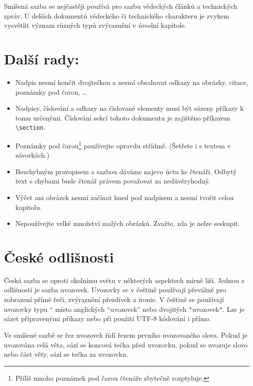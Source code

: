 \documentclass[a4paper,twocolumn,10pt]{article}
\newcommand{\czuv}[1]{\quotedblbase #1\textquotedblleft}
\begin{document}
Smíšená sazba se nejčastěji používá pro sazbu vědeckých článků a technických zpráv.
U delších dokumentů vědeckého či technického charakteru je zvykem vysvětlit význam různých typů zvýraznění v úvodní kapitole.

\section{Další rady:}\label{sec:3}
\begin{itemize}
\item Nadpis nesmí končit dvojtečkou a nesmí obsahovat odkazy na obrázky, citace, poznámky pod čarou, \dots

\item Nadpisy, číslování a odkazy na číslované elementy musí být sázeny příkazy k tomu určenými.
Číslo\-vání sekcí tohoto dokumentu je zajištěno příkazem \verb|\section|.

\item Poznámky pod čarou\footnote{Příliš mnoho poznámek pod čarou čtenáře zbytečně rozptyluje.} používejte opravdu střídmě.
(Šetřete i s textem v závorkách.)

\item Bezchybným pravopisem a sazbou dáváme najevo úctu ke čtenáři.
Odbytý text s chybami bude čtenář právem považovat za nedůvěryhodný.

\item Výčet ani obrázek nesmí začínat hned pod nadpisem a nesmí tvořit celou kapitolu.

\item Nepoužívejte velké množství malých obrázků.
Zvažte, zda je nelze seskupit.
\end{itemize}
\section{České odlišnosti}
Česká sazba se oproti okolnímu světu v některých aspektech mírně liší.
Jednou z odlišností je sazba uvozovek.
Uvozovky se v češtině používají převážně pro zobrazení přímé řeči, zvýraznění přezdívek a ironie.
V češtině se používají uvozovky typu \czuv{9966} místo anglických ``uvozovek'' nebo dvojitých \verb|"|uvozovek\verb|"|.
Lze je sázet připravenými příkazy nebo při použití UTF-8 kódování i přímo.

Ve smíšené sazbě se řez uvozovek řídí řezem prvního uvozovaného slova.
Pokud je uvozována celá věta, sází se koncová tečka před uvozovku, pokud se uvozuje slovo nebo část věty, sází se tečka za uvozovku.
\end{document}
